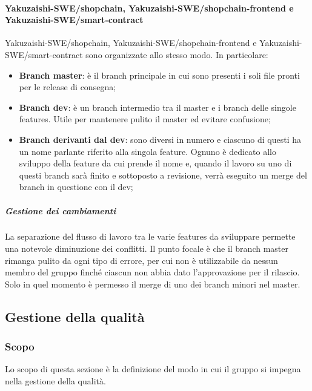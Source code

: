         \paragraph{Yakuzaishi-SWE/shopchain, Yakuzaishi-SWE/shopchain-frontend\glo{} e Yakuzaishi-SWE/smart-contract\glo{}}
        Yakuzaishi-SWE/shopchain, Yakuzaishi-SWE/shopchain-frontend\glo{} e Yakuzaishi-SWE/smart-contract\glo{} sono organizzate allo stesso modo. In particolare:
        \begin{itemize}
            \item \textbf{Branch\glo{} master}: è il branch\glo{} principale in cui sono presenti i soli file pronti per le release di consegna;
            \item \textbf{Branch\glo{} dev}: è un branch\glo{} intermedio tra il master e i branch delle singole features. Utile per mantenere pulito il master ed evitare confusione;
            \item \textbf{Branch\glo{} derivanti dal dev}: sono diversi in numero e ciascuno di questi ha un nome parlante riferito alla singola feature. Ognuno è dedicato allo sviluppo della feature da cui prende il nome e, quando il lavoro su uno di questi branch\glo{} sarà finito e sottoposto a revisione, verrà eseguito un merge\glo{} del branch\glo{} in questione con il dev;
        \end{itemize}

        \subparagraph{Gestione dei cambiamenti}
        La separazione del flusso di lavoro tra le varie features da sviluppare permette una notevole diminuzione dei conflitti. Il punto focale è che il branch\glo{} master rimanga pulito da ogni tipo di errore, per cui non è utilizzabile da nessun membro del gruppo finché ciascun \roleProjectManagerLow{} non abbia dato l'approvazione per il rilascio. Solo in quel momento è permesso il merge\glo{} di uno dei branch\glo{} minori nel master.

\vspace{2cm}

\subsection{Gestione della qualità}\label{subsection: gestione_qualita}
\subsubsection{Scopo}
Lo scopo di questa sezione è la definizione del modo in cui il gruppo si impegna nella gestione della qualità.
